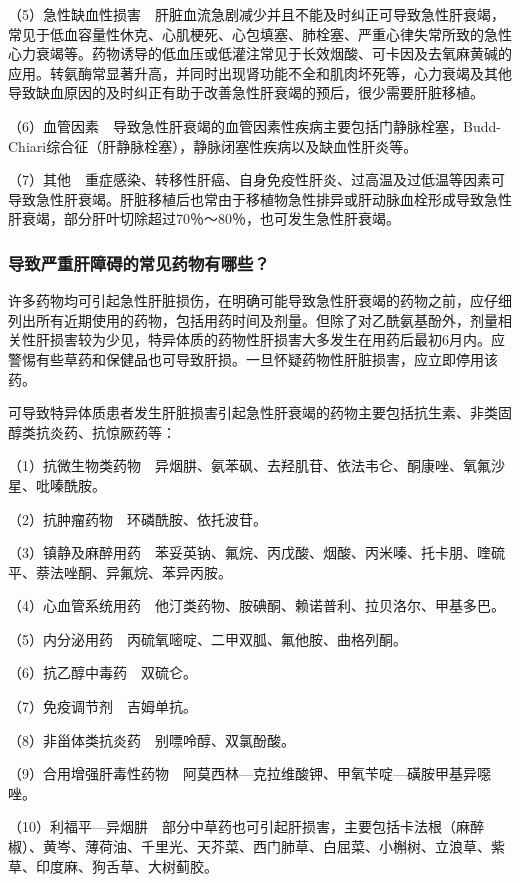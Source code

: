（5）急性缺血性损害　肝脏血流急剧减少并且不能及时纠正可导致急性肝衰竭，常见于低血容量性休克、心肌梗死、心包填塞、肺栓塞、严重心律失常所致的急性心力衰竭等。药物诱导的低血压或低灌注常见于长效烟酸、可卡因及去氧麻黄碱的应用。转氨酶常显著升高，并同时出现肾功能不全和肌肉坏死等，心力衰竭及其他导致缺血原因的及时纠正有助于改善急性肝衰竭的预后，很少需要肝脏移植。

（6）血管因素　导致急性肝衰竭的血管因素性疾病主要包括门静脉栓塞，Budd-Chiari综合征（肝静脉栓塞），静脉闭塞性疾病以及缺血性肝炎等。

（7）其他　重症感染、转移性肝癌、自身免疫性肝炎、过高温及过低温等因素可导致急性肝衰竭。肝脏移植后也常由于移植物急性排异或肝动脉血栓形成导致急性肝衰竭，部分肝叶切除超过70％～80％，也可发生急性肝衰竭。

\subsubsection{导致严重肝障碍的常见药物有哪些？}

许多药物均可引起急性肝脏损伤，在明确可能导致急性肝衰竭的药物之前，应仔细列出所有近期使用的药物，包括用药时间及剂量。但除了对乙酰氨基酚外，剂量相关性肝损害较为少见，特异体质的药物性肝损害大多发生在用药后最初6月内。应警惕有些草药和保健品也可导致肝损。一旦怀疑药物性肝脏损害，应立即停用该药。

可导致特异体质患者发生肝脏损害引起急性肝衰竭的药物主要包括抗生素、非类固醇类抗炎药、抗惊厥药等：

（1）抗微生物类药物　异烟肼、氨苯砜、去羟肌苷、依法韦仑、酮康唑、氧氟沙星、吡嗪酰胺。

（2）抗肿瘤药物　环磷酰胺、依托波苷。

（3）镇静及麻醉用药　苯妥英钠、氟烷、丙戊酸、烟酸、丙米嗪、托卡朋、喹硫平、萘法唑酮、异氟烷、苯异丙胺。

（4）心血管系统用药　他汀类药物、胺碘酮、赖诺普利、拉贝洛尔、甲基多巴。

（5）内分泌用药　丙硫氧嘧啶、二甲双胍、氟他胺、曲格列酮。

（6）抗乙醇中毒药　双硫仑。

（7）免疫调节剂　吉姆单抗。

（8）非甾体类抗炎药　别嘌呤醇、双氯酚酸。

（9）合用增强肝毒性药物　阿莫西林---克拉维酸钾、甲氧苄啶---磺胺甲基异噁
唑。

（10）利福平---异烟肼　部分中草药也可引起肝损害，主要包括卡法根（麻醉椒）、黄岑、薄荷油、千里光、天芥菜、西门肺草、白屈菜、小槲树、立浪草、紫草、印度麻、狗舌草、大树蓟胶。

